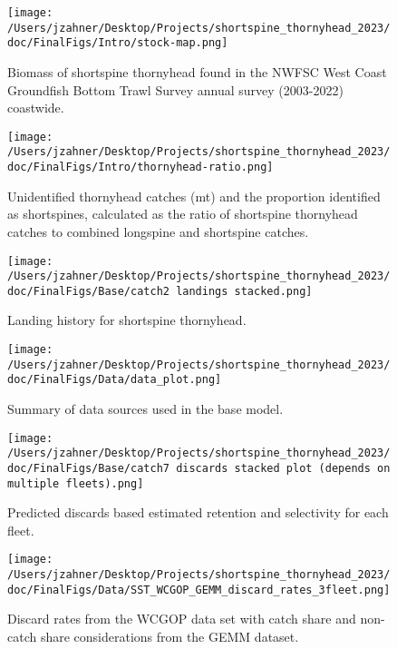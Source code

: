\documentclass[11pt,
  english,
  letterpaper,
]{article}
\begin{document}
\begin{figure}
\centering
\texttt{[image: /Users/jzahner/Desktop/Projects/shortspine\_thornyhead\_2023/doc/FinalFigs/Intro/stock-map.png]}
\caption{Biomass of shortspine thornyhead found in the NWFSC West Coast Groundfish Bottom Trawl Survey annual survey (2003-2022) coastwide.\label{fig:stock-map}}
\end{figure}

\begin{figure}
\centering
\texttt{[image: /Users/jzahner/Desktop/Projects/shortspine\_thornyhead\_2023/doc/FinalFigs/Intro/thornyhead-ratio.png]}
\caption{Unidentified thornyhead catches (mt) and the proportion identified as shortspines, calculated as the ratio of shortspine thornyhead catches to combined longspine and shortspine catches.\label{fig:thornyhead-ratio}}
\end{figure}

\begin{figure}
\centering
\texttt{[image: /Users/jzahner/Desktop/Projects/shortspine\_thornyhead\_2023/doc/FinalFigs/Base/catch2 landings stacked.png]}
\caption{Landing history for shortspine thornyhead.\label{fig:catch_hist}}
\end{figure}

\begin{figure}
\centering
\texttt{[image: /Users/jzahner/Desktop/Projects/shortspine\_thornyhead\_2023/doc/FinalFigs/Data/data\_plot.png]}
\caption{Summary of data sources used in the base model.\label{fig:assessment_data_timeseries}}
\end{figure}

\begin{figure}
\centering
\texttt{[image: /Users/jzahner/Desktop/Projects/shortspine\_thornyhead\_2023/doc/FinalFigs/Base/catch7 discards stacked plot (depends on multiple fleets).png]}
\caption{Predicted discards based estimated retention and selectivity for each fleet.\label{fig:disc_hist}}
\end{figure}

\begin{figure}
\centering
\texttt{[image: /Users/jzahner/Desktop/Projects/shortspine\_thornyhead\_2023/doc/FinalFigs/Data/SST\_WCGOP\_GEMM\_discard\_rates\_3fleet.png]}
\caption{Discard rates from the WCGOP data set with catch share and non-catch share considerations from the GEMM dataset.\label{fig:disc_rates_WCGOP}}
\end{figure}
\end{document}
